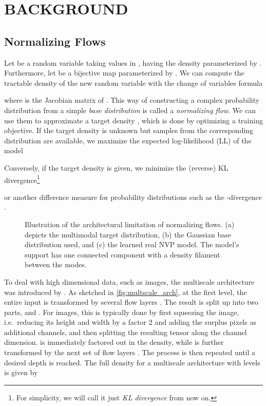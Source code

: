 \documentclass[twoside]{article}
\begin{document}
\section{BACKGROUND}

\subsection{Normalizing Flows}
\label{sec:back_nf}

Let  be a random variable taking values in , having the density  parameterized by . Furthermore, let  be a bijective map parameterized by . We can compute the tractable density of the new random variable  with the change of variables formula

where  is the Jacobian matrix of . This way of constructing a complex probability distribution  from a simple \emph{base distribution}  is called a \emph{normalizing flow}. We can use them to approximate a target density , which is done by optimizing a training objective. If the target density is unknown but samples from the corresponding distribution are available, we maximize the expected log-likelihood (LL) of the model

Conversely, if the target density is given, we minimize the (reverse) KL divergence\footnote{For simplicity, we will call it just \emph{KL divergence} from now on.} \citep{Papamakarios2021}

or another difference measure for probability distributions such as the -divergence \citep{Hernandez-Lobato2016}.

\begin{figure}
	\centering
	\caption{Illustration of the architectural limitation of normalizing flows. (a) depicts the multimodal target distribution, (b) the Gaussian base distribution used, and (c) the learned real NVP model. The model's support has one connected component with a density filament between the modes.}
	\label{fig:artefacts_demo}
\end{figure}

To deal with high dimensional data, such as images, the multiscale architecture was introduced by \cite{Dinh2017}. As sketched in \autoref{fig:multscale_arch}, at the first level, the entire input  is transformed by several flow layers . The result is split up into two parts,  and . For images, this is typically done by first squeezing the image, i.e.\ reducing its height and width by a factor 2 and adding the surplus pixels as additional channels, and then splitting the resulting tensor along the channel dimension.  is immediately factored out in the density, while  is further transformed by the next set of flow layers . The process is then repeated until a desired depth is reached. The full density for a multiscale architecture with  levels is given by
\end{document}
